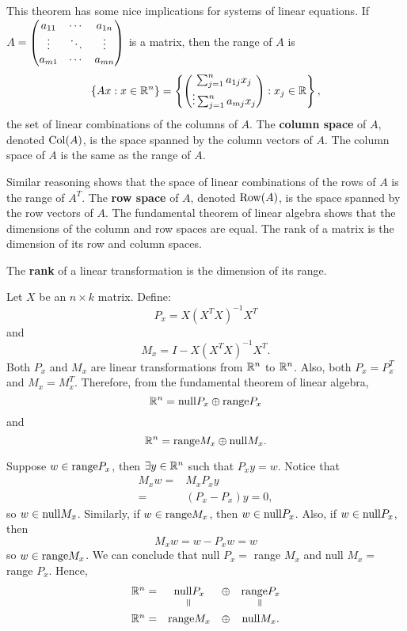This theorem has some nice implications for systems of linear
equations. If $A = \begin{pmatrix} {a}_{11} & \cdots & {a}_{1n} \\ \vdots & \ddots & \vdots \\ {a}_{m1} & \cdots & {a}_{mn} \end{pmatrix}$ is a matrix, then the range of $A$ is 
\begin{align*}
  \{Ax : x \in \mathbb{R}^n\} = \left\lbrace \begin{pmatrix} \sum_{j=1}^n
      a_{1j} x_j \\ 
      \vdots
      \sum_{j=1}^n a_{mj} x_j 
    \end{pmatrix} : x_j \in \mathbb{R} \right\rbrace,
\end{align*}
the set of linear combinations of the columns of $A$. 
The \textbf{column space} of $A$,
denoted $\mathrm{Col}(A)$, is the space spanned by the column vectors of
$A$. The column space of $A$ is the same as the range of $A$.

Similar reasoning shows that the space of linear combinations of the
rows of $A$ is the range of $A^T$. The \textbf{row space} of $A$,
denoted $\mathrm{Row} (A)$, is the space spanned by the row vectors of
$A$. The fundamental theorem of linear algebra shows that the
dimensions of the column and row spaces are equal. The rank of a
matrix is the dimension of its row and column spaces.
\begin{definition}
  The \textbf{rank} of a linear transformation is the dimension of its
  range.
\end{definition}

\begin{example}
  Let $X$ be an $n \times k$ matrix. Define:
  \[ P_x = X (X^T X)^{-1} X^T \]
  and 
  \[ M_x = I - X (X^T X)^{-1} X^T. \]
  Both $P_x$ and $M_x$ are linear transformations from $\mathbb{R}^n$ to
  $\mathbb{R}^n$. Also, both $P_x = P_x^T$ and $M_x = M_x^T$. Therefore, from
  the fundamental theorem of linear algebra, 
  \[ \mathbb{R}^n = \mathrm{null} P_x \oplus \mathrm{range}  P_x \]
  and
  \[ \mathbb{R}^n = \mathrm{range} M_x \oplus \mathrm{null}  M_x. \]
  
  Suppose $w \in \mathrm{range}  P_x$, then $\exists y \in \mathbb{R}^n$ such
  that $P_x y = w$. Notice that 
  \begin{align*}
    M_x w = & M_x P_x y \\
    = & (P_x - P_x)y = 0, 
  \end{align*}
  so $w \in \mathrm{null}  M_x$.  Similarly, if $w \in \mathrm{range} 
  M_x$, then $w \in \mathrm{null}  P_x$. Also, if $w \in \mathrm{null} 
  P_x$, then 
  \[ M_x w = w - P_x w = w \]
  so $w \in \mathrm{range}  M_x$. We can conclude that null $P_x = $
  range $M_x$ and null $M_x = $ range $P_x$. Hence,
  \[
  \begin{array}{cccc}
    \R^n = & \nulls  P_x & \oplus & \range  P_x \\
                & \verteq &            & \verteq \\
    \R^n = & \range M_x & \oplus & \nulls  M_x.
  \end{array}
  \]  
\end{example}

